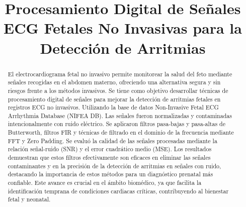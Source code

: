 \documentclass[10pt, conference]{IEEEtran}
\begin{document}
\onehalfspacing %

\title{Procesamiento Digital de Señales ECG Fetales No Invasivas para la Detección de Arritmias}

\author{
	\and
}

\maketitle

\begin{abstract}

El electrocardiograma fetal no invasivo permite monitorear la salud del feto mediante señales recogidas en el abdomen materno, ofreciendo una alternativa segura y sin riesgos frente a los métodos invasivos. Se tiene como objetivo desarrollar técnicas de procesamiento digital de señales para mejorar la detección de arritmias fetales en registros ECG no invasivos. Utilizando la base de datos Non-Invasive Fetal ECG Arrhythmia Database (NIFEA DB).
Las señales fueron normalizadas y contaminadas intencionalmente con ruido eléctrico. Se aplicaron filtros pasa-bajas y pasa-altas de Butterworth, filtros FIR y técnicas de filtrado en el dominio de la frecuencia mediante FFT y Zero Padding. Se evaluó la calidad de las señales procesadas mediante la relación señal-ruido (SNR) y el error cuadrático medio (MSE).
Los resultados demuestran que estos filtros efectivamente son eficaces en eliminar las señales contaminantes y en la precisión de la detección de arritmias en señales con ruido, destacando la importancia de estos métodos para un diagnóstico prenatal más confiable. Este avance es crucial en el ámbito biomédico, ya que facilita la identificación temprana de condiciones cardiacas críticas, contribuyendo al bienestar fetal y neonatal.

\end{abstract}
\end{document}
